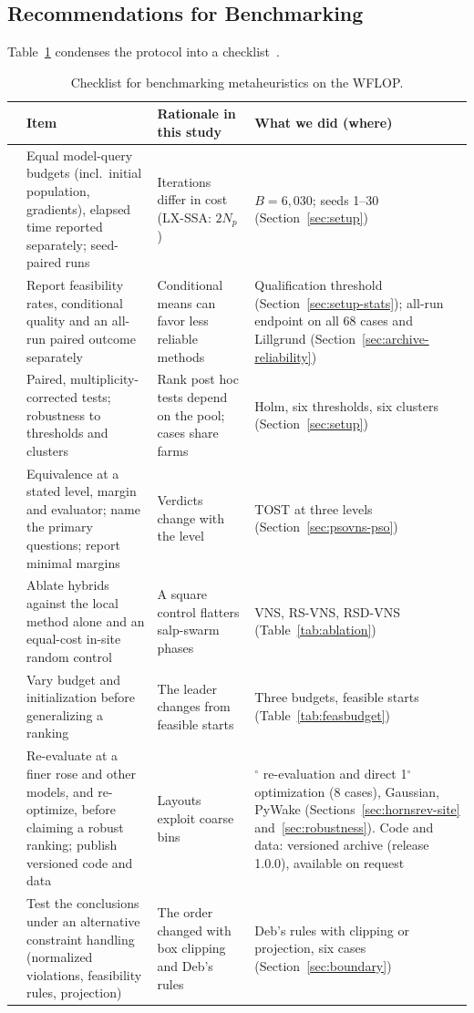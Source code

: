 \subsection{Recommendations for Benchmarking}
\label{sec:disc-recs}
Table~\ref{tab:recommendations} condenses the protocol into a checklist~\cite{BartzBeielstein2020,LaTorre2021}.
\begin{table}[!t]
\centering
\caption{Checklist for benchmarking metaheuristics on the WFLOP.}
\label{tab:recommendations}
\footnotesize
\begin{tabular}{@{}>{\raggedright\arraybackslash}p{}>{\raggedright\arraybackslash}p{}>{\raggedright\arraybackslash}p{}>{\raggedright\arraybackslash}p{}@{}}
\toprule
& Item & Rationale in this study & What we did (where) \\
\midrule
1 & Equal model-query budgets (incl.\ initial population, gradients), elapsed time reported separately; seed-paired runs & Iterations differ in cost (LX-SSA: $2N_p$) & $B=6{,}030$; seeds 1--30 (Section~\ref{sec:setup}) \\
2 & Report feasibility rates, conditional quality and an all-run paired outcome separately & Conditional means can favor less reliable methods & Qualification threshold (Section~\ref{sec:setup-stats}); all-run endpoint on all 68 cases and Lillgrund (Section~\ref{sec:archive-reliability}) \\
3 & Paired, multiplicity-corrected tests; robustness to thresholds and clusters & Rank post hoc tests depend on the pool; cases share farms & Holm, six thresholds, six clusters (Section~\ref{sec:setup}) \\
4 & Equivalence at a stated level, margin and evaluator; name the primary questions; report minimal margins & Verdicts change with the level & TOST at three levels (Section~\ref{sec:psovns-pso}) \\
5 & Ablate hybrids against the local method alone and an equal-cost in-site random control & A square control flatters salp-swarm phases & VNS, RS-VNS, RSD-VNS (Table~\ref{tab:ablation}) \\
6 & Vary budget and initialization before generalizing a ranking & The leader changes from feasible starts & Three budgets, feasible starts (Table~\ref{tab:feasbudget}) \\
7 & Re-evaluate at a finer rose and other models, and re-optimize, before claiming a robust ranking; publish versioned code and data & Layouts exploit coarse bins & 1$^\circ$ re-evaluation and direct 1$^\circ$ optimization (8 cases), Gaussian, PyWake (Sections~\ref{sec:hornsrev-site} and~\ref{sec:robustness}). Code and data: versioned archive (release 1.0.0), available on request \\
8 & Test the conclusions under an alternative constraint handling (normalized violations, feasibility rules, projection) & The order changed with box clipping and Deb's rules & Deb's rules with clipping or projection, six cases (Section~\ref{sec:boundary}) \\
\bottomrule
\end{tabular}
\end{table}
